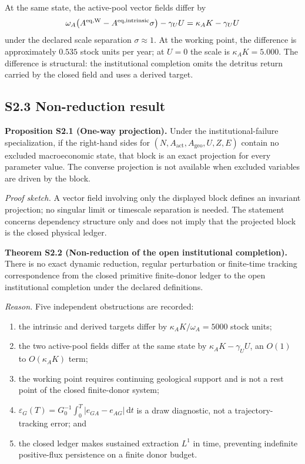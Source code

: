 \documentclass[11pt]{article}
\newcommand{\dd}{\,\mathrm{d}}
\begin{document}
At the same state, the active-pool vector fields differ by
\begin{equation}
\omega_A\bigl(A^{\rm eq,W}-A^{\rm eq,intrinsic}\sigma\bigr)-\gamma_UU
=\kappa_AK-\gamma_UU
\end{equation}
under the declared scale separation $\sigma\approx1$. At the working point, the difference is approximately $0.535$ stock units per year; at $U=0$ the scale is $\kappa_AK=5.000$. The difference is structural: the institutional completion omits the detritus return carried by the closed field and uses a derived target.

\subsection*{S2.3 Non-reduction result}

\textbf{Proposition S2.1 (One-way projection).} Under the institutional-failure specialization, if the right-hand sides for $(N,A_{\mathrm{act}},A_{\mathrm{geo}},U,Z,E)$ contain no excluded macroeconomic state, that block is an exact projection for every parameter value. The converse projection is not available when excluded variables are driven by the block.

\emph{Proof sketch.} A vector field involving only the displayed block defines an invariant projection; no singular limit or timescale separation is needed. The statement concerns dependency structure only and does not imply that the projected block is the closed physical ledger.

\textbf{Theorem S2.2 (Non-reduction of the open institutional completion).} There is no exact dynamic reduction, regular perturbation or finite-time tracking correspondence from the closed primitive finite-donor ledger to the open institutional completion under the declared definitions.

\emph{Reason.} Five independent obstructions are recorded:
\begin{enumerate}
\item the intrinsic and derived targets differ by $\kappa_AK/\omega_A=5000$ stock units;
\item the two active-pool fields differ at the same state by $\kappa_AK-\gamma_UU$, an $O(1)$ to $O(\kappa_AK)$ term;
\item the working point requires continuing geological support and is not a rest point of the closed finite-donor system;
\item $\varepsilon_G(T)=G_0^{-1}\int_0^T|e_{GA}-e_{AG}|\dd t$ is a draw diagnostic, not a trajectory-tracking error; and
\item the closed ledger makes sustained extraction $L^1$ in time, preventing indefinite positive-flux persistence on a finite donor budget.
\end{enumerate}
\end{document}
